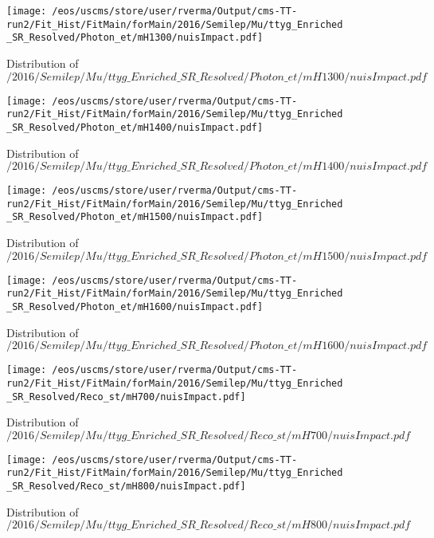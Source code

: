 \begin{figure}
\centering
\texttt{[image: /eos/uscms/store/user/rverma/Output/cms-TT-run2/Fit\_Hist/FitMain/forMain/2016/Semilep/Mu/ttyg\_Enriched\_SR\_Resolved/Photon\_et/mH1300/nuisImpact.pdf]}
\caption{Distribution of $/2016/Semilep/Mu/ttyg\_Enriched\_SR\_Resolved/Photon\_et/mH1300/nuisImpact.pdf$}
\end{figure}

\begin{figure}
\centering
\texttt{[image: /eos/uscms/store/user/rverma/Output/cms-TT-run2/Fit\_Hist/FitMain/forMain/2016/Semilep/Mu/ttyg\_Enriched\_SR\_Resolved/Photon\_et/mH1400/nuisImpact.pdf]}
\caption{Distribution of $/2016/Semilep/Mu/ttyg\_Enriched\_SR\_Resolved/Photon\_et/mH1400/nuisImpact.pdf$}
\end{figure}

\begin{figure}
\centering
\texttt{[image: /eos/uscms/store/user/rverma/Output/cms-TT-run2/Fit\_Hist/FitMain/forMain/2016/Semilep/Mu/ttyg\_Enriched\_SR\_Resolved/Photon\_et/mH1500/nuisImpact.pdf]}
\caption{Distribution of $/2016/Semilep/Mu/ttyg\_Enriched\_SR\_Resolved/Photon\_et/mH1500/nuisImpact.pdf$}
\end{figure}

\begin{figure}
\centering
\texttt{[image: /eos/uscms/store/user/rverma/Output/cms-TT-run2/Fit\_Hist/FitMain/forMain/2016/Semilep/Mu/ttyg\_Enriched\_SR\_Resolved/Photon\_et/mH1600/nuisImpact.pdf]}
\caption{Distribution of $/2016/Semilep/Mu/ttyg\_Enriched\_SR\_Resolved/Photon\_et/mH1600/nuisImpact.pdf$}
\end{figure}

\begin{figure}
\centering
\texttt{[image: /eos/uscms/store/user/rverma/Output/cms-TT-run2/Fit\_Hist/FitMain/forMain/2016/Semilep/Mu/ttyg\_Enriched\_SR\_Resolved/Reco\_st/mH700/nuisImpact.pdf]}
\caption{Distribution of $/2016/Semilep/Mu/ttyg\_Enriched\_SR\_Resolved/Reco\_st/mH700/nuisImpact.pdf$}
\end{figure}

\begin{figure}
\centering
\texttt{[image: /eos/uscms/store/user/rverma/Output/cms-TT-run2/Fit\_Hist/FitMain/forMain/2016/Semilep/Mu/ttyg\_Enriched\_SR\_Resolved/Reco\_st/mH800/nuisImpact.pdf]}
\caption{Distribution of $/2016/Semilep/Mu/ttyg\_Enriched\_SR\_Resolved/Reco\_st/mH800/nuisImpact.pdf$}
\end{figure}

